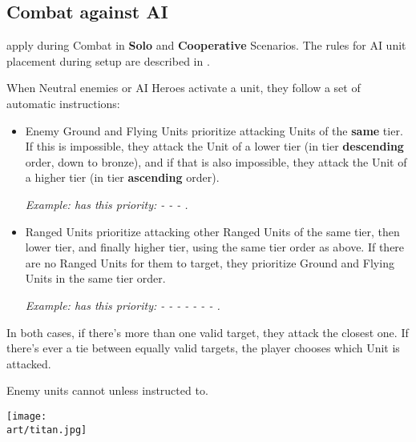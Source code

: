 \begin{multicols}{2}
\subsection*{Combat against AI}

 apply during Combat in \textbf{Solo} and \textbf{Cooperative} Scenarios.
The rules for AI unit placement during setup are described in .

When Neutral enemies or AI Heroes activate a unit, they follow a set of automatic instructions:\par

\begin{itemize}
  \item Enemy Ground  and Flying  Units prioritize attacking Units of the \textbf{same} tier.
  If this is impossible, they attack the Unit of a lower tier (in tier \textbf{descending} order, down to bronze), and if that is also impossible, they attack the Unit of a higher tier (in tier \textbf{ascending} order).\par

  \textit{Example:  has this priority:
  - 
  - 
  - .}

  \item Ranged  Units prioritize attacking other Ranged  Units of the same tier, then lower tier, and finally higher tier, using the same tier order as above.
  If there are no Ranged  Units for them to target, they prioritize Ground  and Flying  Units in the same tier order.\par

  \textit{Example:  has this priority:
  - 
  - 
  - 
  - 
  - 
  - 
  - .}
\end{itemize}

In both cases, if there's more than one valid target, they attack the closest one.
If there's ever a tie between equally valid targets, the player chooses which Unit is attacked.\par

Enemy units cannot  unless instructed to.

\vfill

\begin{center}
    \texttt{[image: \\art/titan.jpg]}
\end{center}

\end{multicols}

